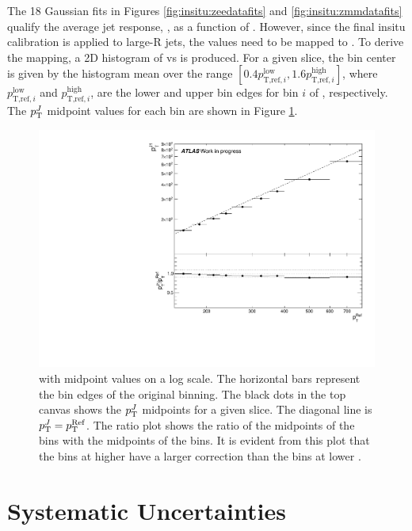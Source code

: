 The 18 Gaussian fits in Figures \ref{fig:insitu:zeedatafits} and \ref{fig:insitu:zmmdatafits} qualify the average jet response, \rdb, as a function of \ptref. However, since the final insitu calibration is applied to large-R jets, the \ptref values need to be mapped to \ptJ. To derive the mapping, a 2D histogram of \ptref vs \ptJ is produced. For a given \ptref slice, the \ptJ bin center is given by the histogram mean over the range $[0.4p_{\text{T,ref},i}^{\text{low}},1.6p_{\text{T,ref},i}^{\text{high}}]$, where $p_{\text{T,ref},i}^{\text{low}}$ and $p_{\text{T,ref},i}^{\text{high}}$, are the lower and upper bin edges for bin $i$ of \ptref, respectively. The $p_{\text{T}}^J$ midpoint values for each \ptref bin are shown in Figure \ref{fig:insitu:mapping}.
\begin{figure}[t]
\centering
\includegraphics[width=\textwidth]{plots/insitu/Sherpa.all_MappingVsPt_WIP.pdf}    
\caption{\ptref with midpoint \ptJ values on a log scale. The horizontal bars represent the bin edges of the original \ptref binning. The black dots in the top canvas shows the $p_{\text{T}}^J$ midpoints for a given \ptref slice. The diagonal line is $p_{\text{T}}^J = p_{\text{T}}^{\text{Ref}}$. The ratio plot shows the ratio of the midpoints of the \ptJ bins with the midpoints of the \ptref bins. It is evident from this plot that the bins at higher \ptref have a larger correction than the bins at lower \ptref.\label{fig:insitu:mapping}}
\end{figure}

\section{Systematic Uncertainties}

